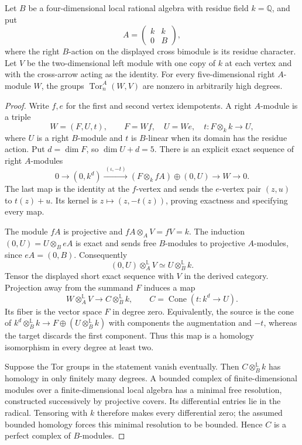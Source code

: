 \begin{lemma}
\label{B:six-local-corner-odd-Euler}
Let $B$ be a four-dimensional local rational algebra with residue
field $k=\mathbb Q$, and put
\[
 A=\begin{pmatrix}k&k\\0&B\end{pmatrix},
\]
where the right $B$-action on the displayed cross bimodule is its
residue character.  Let $V$ be the two-dimensional left module
with one copy of $k$ at each vertex and with the cross-arrow
acting as the identity.  For every five-dimensional right
$A$-module $W$, the groups $\operatorname{Tor}^A_n(W,V)$ are
nonzero in arbitrarily high degrees.
\end{lemma}
\begin{proof}
Write $f,e$ for the first and second vertex idempotents.
A right $A$-module is a triple
\[
 W=(F,U,t),\qquad F=Wf,\quad U=We,\quad
 t:F\otimes_k k\longrightarrow U,
\]
where $U$ is a right $B$-module and $t$ is $B$-linear when its
domain has the residue action.  Put $d=\dim F$, so
$\dim U+d=5$.  There is an explicit exact sequence of right
$A$-modules
\[
 0\longrightarrow(0,k^d)
 \xrightarrow{\ (\iota,-t)\ }
 (F\otimes_k fA)\oplus(0,U)
 \longrightarrow W\longrightarrow0.
\]
The last map is the identity at the $f$-vertex and sends the
$e$-vertex pair $(z,u)$ to $t(z)+u$.  Its kernel is
$z\mapsto(z,-t(z))$, proving exactness and specifying every map.

The module $fA$ is projective and $fA\otimes_A V=fV=k$.
The induction $(0,U)=U\otimes_B eA$ is exact and sends free
$B$-modules to projective $A$-modules, since $eA=(0,B)$.
Consequently
\[
 (0,U)\otimes_A^{\mathbb L}V
 \simeq U\otimes_B^{\mathbb L}k.
\]
Tensor the displayed short exact sequence with $V$ in the derived
category.  Projection away from the summand $F$ induces a map
\[
 W\otimes_A^{\mathbb L}V
 \longrightarrow
 C\otimes_B^{\mathbb L}k,
 \qquad
 C=\operatorname{Cone}(t:k^d\longrightarrow U).
\]
Its fiber is the vector space $F$ in degree zero.  Equivalently,
the source is the cone of
$k^d\otimes_B^{\mathbb L}k\to
 F\oplus(U\otimes_B^{\mathbb L}k)$ with components the
augmentation and $-t$, whereas the target discards the first
component.  Thus this map is a homology isomorphism in every
degree at least two.

Suppose the Tor groups in the statement vanish eventually.
Then $C\otimes_B^{\mathbb L}k$ has homology in only finitely
many degrees.  A bounded complex of finite-dimensional modules
over a finite-dimensional local algebra has a minimal free
resolution, constructed successively by projective covers.
Its differential entries lie in the radical.  Tensoring with
$k$ therefore makes every differential zero; the assumed
bounded homology forces this minimal resolution to be bounded.
Hence $C$ is a perfect complex of $B$-modules.


\end{proof}
